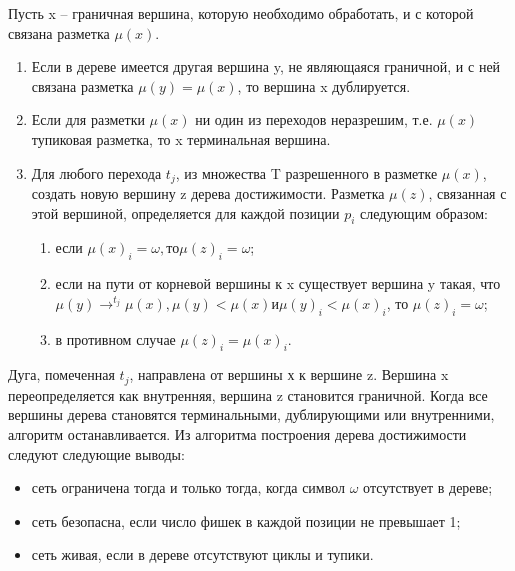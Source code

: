 Пусть x – граничная вершина, которую необходимо обработать, и с которой связана разметка $ \mu(x) $.
\begin{enumerate}
\item Если в дереве имеется другая вершина y, не являющаяся граничной, и с ней связана разметка $ \mu(y) = \mu(x) $, то вершина x дублируется. 
\item Если для разметки $ \mu(x) $ ни один из переходов неразрешим, т.е. $ \mu(x) $ тупиковая разметка, то x терминальная вершина.
\item Для любого перехода $ t_{j} $, из множества T разрешенного в разметке $ \mu(x) $, создать новую вершину z дерева достижимости. Разметка $ \mu(z) $, связанная с этой вершиной, определяется для каждой позиции $ p_{i} $ следующим образом:
\begin{enumerate}
\item если $ \mu(x)_{i} = \omega, то \mu(z)_{i} = \omega $;
\item если на пути от корневой вершины к x существует вершина y такая, что $ \mu(y)\rightarrow^{t_{j}} \mu(x), \mu(y) < \mu(x) и \mu(y)_{i} < \mu(x)_{i} $, то $ \mu(z)_{i} = \omega $;
\item в противном случае $ \mu(z)_{i} = \mu(x)_{i} $.
\end{enumerate}

\end{enumerate}

Дуга, помеченная $ t_{j} $, направлена от вершины х к вершине z. Вершина x переопределяется как внутренняя, вершина z становится граничной. Когда все вершины дерева становятся терминальными, дублирующими или внутренними, алгоритм останавливается. Из алгоритма построения дерева достижимости следуют следующие выводы:
\begin{itemize}
\item сеть ограничена тогда и только тогда, когда символ $ \omega $ отсутствует в дереве;
\item сеть безопасна, если число фишек в каждой позиции не превышает 1;
\item сеть живая, если в дереве отсутствуют циклы и тупики.
\end{itemize}

\label{cha:design}
